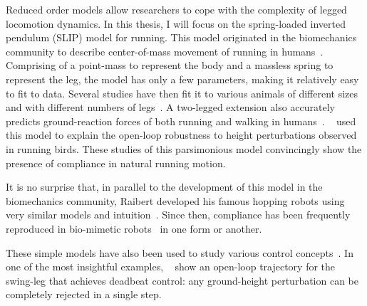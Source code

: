 Reduced order models allow researchers to cope with the complexity of legged locomotion dynamics. 
In this thesis, I will focus on the spring-loaded inverted pendulum (SLIP) model for running. This model originated in the biomechanics community to describe center-of-mass movement of running in humans~\cite{blickhan1989spring}. Comprising of a point-mass to represent the body and a massless spring to represent the leg, the model has only a few parameters, making it relatively easy to fit to data.
Several studies have then fit it to various animals of different sizes and with different numbers of legs~\cite{blickhan1993similarity,daley2006running,jindrich2002dynamic}. A two-legged extension also accurately predicts ground-reaction forces of both running and walking in humans~\cite{geyer2006compliant}. ~\textcite{daley2006running} used this model to explain the open-loop robustness to height perturbations observed in running birds.
These studies of this parsimonious model convincingly show the presence of compliance in natural running motion. \par
It is no surprise that, in parallel to the development of this model in the biomechanics community, Raibert developed his famous hopping robots using very similar models and intuition~\cite[see Figure 2.5]{raibert1986legged}.
Since then, compliance has been frequently reproduced in bio-mimetic robots~\cite{sprowitz2013cheetah,buchli2006resonance,hubicki2016atrias,hutter2016anymal,kenneally2016design,ramos2018facilitating} in one form or another. \par
These simple models have also been used to study various control concepts~\cite{piovan2013two,cnops2015basin,piovan2015reachability}. In one of the most insightful examples, ~\textcite{wu20133} show an open-loop trajectory for the swing-leg that achieves deadbeat control: any ground-height perturbation can be completely rejected in a single step. \par 
